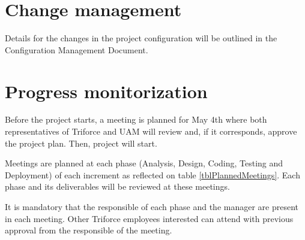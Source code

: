 \section{Change management}

Details for the changes in the project configuration will be outlined in the Configuration Management Document.

\section{Progress monitorization}

Before the project starts, a meeting is planned for May 4th where both representatives of Triforce and UAM will review and, if it corresponds, approve the project plan. Then, project will start.

Meetings are planned at each phase (Analysis, Design, Coding, Testing and Deployment) of each increment as reflected on table \ref{tblPlannedMeetings}. Each phase and its deliverables will be reviewed at these meetings.

It is mandatory that the responsible of each phase and the manager are present in each meeting. Other Triforce employees interested can attend with previous approval from the responsible of the meeting.

